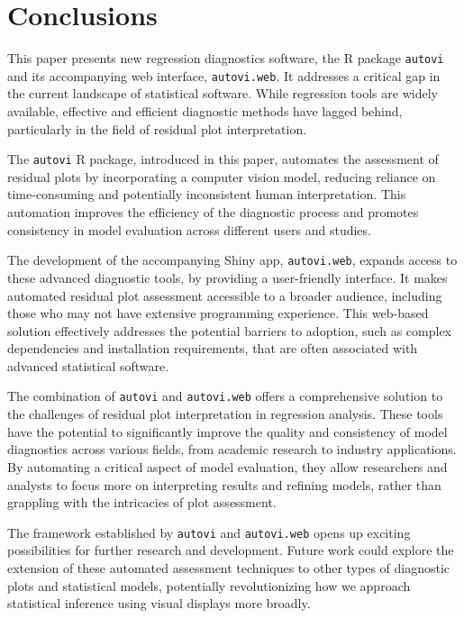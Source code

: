 \documentclass[
doublespace,
  times]{anzsauth}
\begin{document}
\section{Conclusions}\label{sec-autovi-conclusion}

This paper presents new regression diagnostics software, the R package
\texttt{autovi} and its accompanying web interface, \texttt{autovi.web}.
It addresses a critical gap in the current landscape of statistical
software. While regression tools are widely available, effective and
efficient diagnostic methods have lagged behind, particularly in the
field of residual plot interpretation.

The \texttt{autovi} R package, introduced in this paper, automates the
assessment of residual plots by incorporating a computer vision model,
reducing reliance on time-consuming and potentially inconsistent human
interpretation. This automation improves the efficiency of the
diagnostic process and promotes consistency in model evaluation across
different users and studies.

The development of the accompanying Shiny app, \texttt{autovi.web},
expands access to these advanced diagnostic tools, by providing a
user-friendly interface. It makes automated residual plot assessment
accessible to a broader audience, including those who may not have
extensive programming experience. This web-based solution effectively
addresses the potential barriers to adoption, such as complex
dependencies and installation requirements, that are often associated
with advanced statistical software.

The combination of \texttt{autovi} and \texttt{autovi.web} offers a
comprehensive solution to the challenges of residual plot interpretation
in regression analysis. These tools have the potential to significantly
improve the quality and consistency of model diagnostics across various
fields, from academic research to industry applications. By automating a
critical aspect of model evaluation, they allow researchers and analysts
to focus more on interpreting results and refining models, rather than
grappling with the intricacies of plot assessment.

The framework established by \texttt{autovi} and \texttt{autovi.web}
opens up exciting possibilities for further research and development.
Future work could explore the extension of these automated assessment
techniques to other types of diagnostic plots and statistical models,
potentially revolutionizing how we approach statistical inference using
visual displays more broadly.
\end{document}
